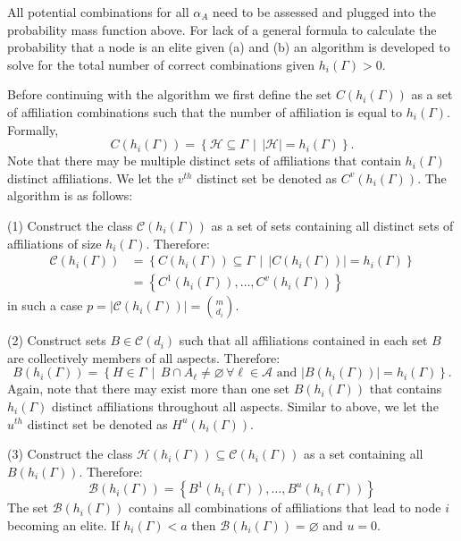 \begin{subappendices}
All potential combinations for all $\alpha_{A}$ need to be assessed and plugged into the probability mass function above. For lack of a general formula to calculate the probability that a node is an elite given (a) and (b) an algorithm is developed to solve for the total number of correct combinations given $h_{i}(\Gamma) > 0$.

Before continuing with the algorithm we first define the set $C(h_{i}(\Gamma))$ as a set of affiliation combinations such that the number of affiliation is equal to $h_{i}(\Gamma)$. Formally,
\[
C(h_{i}(\Gamma)) = \left\{ \mathcal{H} \subseteq \Gamma \, \mid \, | \mathcal{H} | = h_{i}(\Gamma) \right\} .
\]
Note that there may be multiple distinct sets of affiliations that contain $h_{i}(\Gamma)$ distinct affiliations. We let the $v^{th}$ distinct set be denoted as $C^{v}(h_{i}(\Gamma))$. The algorithm is as follows:

\begin{abet}
\item[(1)] Construct the class $\mathcal{C}(h_{i}(\Gamma))$ as a set of sets containing all distinct sets of affiliations of size $h_{i}(\Gamma)$. Therefore:
\begin{align*}
\mathcal{C}(h_{i}(\Gamma)) & = \left\{ C(h_{i}(\Gamma)) \subseteq \Gamma \, \mid \, | C(h_{i}(\Gamma)) | = h_{i}(\Gamma) \right\}\\
                   & = \left\{C^{1}(h_{i}(\Gamma)), \ldots, C^{v}(h_{i}(\Gamma))\right\}
\end{align*}
in such a case $p = | \mathcal{C}(h_{i}(\Gamma)) | = \binom{m}{d_{i}}$.

\item[(2)] Construct sets $B \in \mathcal{C}(d_{i})$ such that all affiliations contained in each set $B$ are collectively members of all aspects. Therefore:
\[
B(h_{i}(\Gamma)) = \left\{ H \in \Gamma \, \mid \, B \cap A_{\ell} \neq \varnothing \, \forall \ell \in \mathcal{A} \mbox{ and } | B (h_{i}(\Gamma)) | = h_{i}(\Gamma) \right\} .
\]
Again, note that there may exist more than one set $B(h_{i}(\Gamma))$ that contains $h_{i}(\Gamma)$ distinct affiliations throughout all aspects. Similar to above, we let the $u^{th}$ distinct set be denoted as $H^{u}(h_{i}(\Gamma))$.

\item[(3)] Construct the class $\mathcal{H}(h_{i}(\Gamma)) \subseteq \mathcal{C}(h_{i}(\Gamma))$ as a set containing all $B(h_{i}(\Gamma))$. Therefore:
\[
\mathcal{B}(h_{i}(\Gamma)) = \left\{ B^{1}(h_{i}(\Gamma)), \ldots, B^{u}(h_{i}(\Gamma)) \right\}
\]
The set $\mathcal{B}(h_{i}(\Gamma))$ contains all combinations of affiliations that lead to node $i$ becoming an elite. If $h_{i}(\Gamma) < a$ then $\mathcal{B}(h_{i}(\Gamma)) = \varnothing$ and $u = 0$.


\end{abet}
\end{subappendices}
